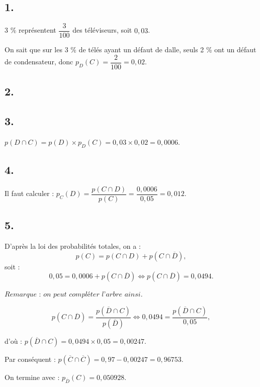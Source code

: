 \subsection*{1.}

3 \% représentent \(\dfrac{3}{100}\) des téléviseurs, soit \(0{,}03\).

On sait que sur les 3 \% de télés ayant un défaut de dalle, seuls 2 \% ont un défaut de condensateur, donc \(p_D(C) = \dfrac{2}{100} = 0{,}02\).

\subsection*{2.}

\begin{center}
\end{center}

\subsection*{3.}

\(p(D \cap C) = p(D) \times p_D(C) = 0{,}03 \times 0{,}02 = 0{,}0006.\)

\subsection*{4.}

Il faut calculer : \(p_C(D) = \dfrac{p(C \cap D)}{p(C)} = \dfrac{0{,}0006}{0{,}05} = 0{,}012\).

\subsection*{5.}

D'après la loi des probabilités totales, on a :
\[
p(C) = p(C \cap D) + p(C \cap \overline{D}),
\]
soit :
\[
0{,}05 = 0{,}0006 + p(C \cap \overline{D}) \iff p(C \cap \overline{D}) = 0{,}0494.
\]

\(\textit{Remarque : on peut compléter l'arbre ainsi}\). 

\[
p(C \cap \overline{D}) = \dfrac{p(\overline{D} \cap C)}{p(\overline{D})} \iff 0{,}0494 = \dfrac{p(\overline{D} \cap C)}{0{,}05},
\]  

d'où : \(p(\overline{D} \cap C) = 0{,}0494 \times 0{,}05 = 0{,}00247\).

Par conséquent : \(p(\overline{C} \cap \overline{C}) = 0{,}97 - 0{,}00247 = 0{,}96753\).

On termine avec : \(p_{\overline{D}}(C) = 0{,}050928\).
